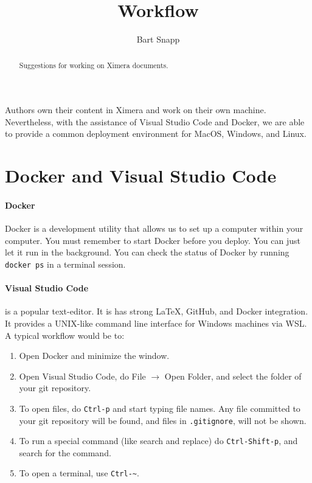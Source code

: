 \documentclass{ximera}
\title{Workflow}
\author{Bart Snapp}
\begin{document}
\begin{abstract}
      Suggestions for working on Ximera documents.
\end{abstract}
\maketitle

Authors own their content in Ximera and work on their own machine.
Nevertheless, with the assistance of Visual Studio Code and Docker, we are able
to provide a common deployment environment for MacOS, Windows, and Linux.

\section{Docker and Visual Studio Code}

\paragraph{Docker}

Docker is a development utility that allows us to set up a computer within your
computer. You must remember to start Docker before you deploy. You can just let
it run in the background. You can check the status of Docker by running
\verb!docker ps! in a terminal session.

\paragraph{Visual Studio Code}
is a popular text-editor. It is has strong \LaTeX, GitHub,
and Docker integration. It provides a UNIX-like command line interface for
Windows machines via WSL. A typical workflow would be to:
\begin{enumerate}
      \item Open Docker and minimize the window.
      \item Open Visual Studio Code, do File $\to$ Open Folder, and select the
            folder of your git repository.
      \item To open files, do \verb!Ctrl-p! and start typing file names. Any
            file
            committed to your git repository will be found, and files in
            \verb!.gitignore!, will not be shown.
      \item To run a special command (like search and replace) do
            \verb!Ctrl-Shift-p!, and search for the command.
      \item To open a terminal, use \verb!Ctrl-~!.
\end{enumerate}
\end{document}
